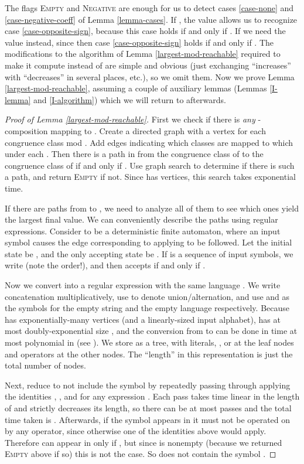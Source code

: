 \documentclass[11pt]{amsart}
\theoremstyle{definition}
\theoremstyle{remark}
\begin{document}
The flags \textsc{Empty} and \textsc{Negative} are enough for us to detect cases \ref{case-none} and \ref{case-negative-coeff} of Lemma \ref{lemma-cases}. If , the value  allows us to recognize case \ref{case-opposite-sign}, because this case holds if and only if . If  we need the value  instead, since then case \ref{case-opposite-sign} holds if and only if . The modifications to the algorithm of Lemma \ref{largest-mod-reachable} required to make it compute  instead of  are simple and obvious (just exchanging ``increases'' with ``decreases'' in several places, etc.), so we omit them. Now we prove Lemma \ref{largest-mod-reachable}, assuming a couple of auxiliary lemmas (Lemmas \ref{I-lemma} and \ref{I-algorithm}) which we will return to afterwards.

\begin{proof}[Proof of Lemma \ref{largest-mod-reachable}]
First we check if there is \emph{any} -composition mapping  to . Create a directed graph  with a vertex for each congruence class mod . Add edges indicating which classes are mapped to which under each . Then there is a path in  from the congruence class of  to the congruence class of  if and only if . Use graph search to determine if there is such a path, and return \textsc{Empty} if not. Since  has  vertices, this search takes exponential time.

If there are paths from  to , we need to analyze all of them to see which ones yield the largest final value. We can conveniently describe the paths using regular expressions. Consider  to be a deterministic finite automaton, where an input symbol  causes the edge corresponding to applying  to be followed. Let the initial state be , and the only accepting state be . If  is a sequence of input symbols, we write  (note the order!), and then  accepts  if and only if .

Now we convert  into a regular expression  with the same language . We write concatenation multiplicatively, use  to denote union/alternation, and use  and  as the symbols for the empty string and the empty language respectively. Because  has exponentially-many vertices (and a linearly-sized input alphabet),  has at most doubly-exponential size , and the conversion from  to  can be done in time at most polynomial in  (see \cite{mcnaughton-yamada, dfa-to-re-upper}). We store  as a tree, with literals, , or  at the leaf nodes and operators at the other nodes. The ``length''  in this representation is just the total number of nodes.

Next, reduce  to not include the symbol  by repeatedly passing through  applying the identities , , and  for any expression . Each pass takes time linear in the length of  and strictly decreases its length, so there can be at most  passes and the total time taken is . Afterwards, if the symbol  appears in  it must not be operated on by any operator, since otherwise one of the identities above would apply. Therefore  can appear in  only if , but since  is nonempty (because we returned \textsc{Empty} above if so) this is not the case. So  does not contain the symbol .


\end{proof}
\end{document}
